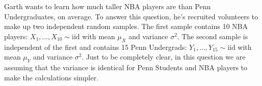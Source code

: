 \documentclass[addpoints,12pt]{exam}
\begin{document}
\begin{questions}
\question Garth wants to learn how much taller NBA players are than Penn Undergraduates, on average. To answer this question, he's recruited volunteers to make up two independent random samples. The first sample contains 10 NBA players: $X_1, \hdots, X_{10} \sim \mbox{iid}$ with mean $\mu_X$ and variance $\sigma^2$. The second sample is independent of the first and contains 15 Penn Undergrads: $Y_1, \hdots, Y_{15} \sim \mbox{iid}$ with mean $\mu_Y$ and variance $\sigma^2$. Just to be completely clear, in this question we are assuming that the variance is identical for Penn Students and NBA players to make the calculations simpler.
\end{questions}
\end{document}
